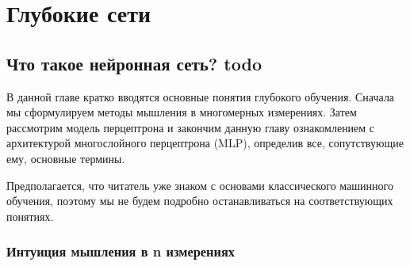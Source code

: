 






\section{Глубокие сети}

\subsection{Что такое нейронная сеть? {\color{red} todo}}

В данной главе кратко вводятся основные понятия глубокого обучения. 
Сначала мы сформулируем методы мышления в многомерных измерениях. 
Затем рассмотрим модель перцептрона и закончим данную главу ознакомлением с 
архитектурой многослойного перцептрона (MLP), 
определив все, сопутствующие ему, основные термины.

Предполагается, что читатель уже знаком с основами классического машинного обучения, 
поэтому мы не будем подробно останавливаться на соответствующих понятиях.

\subsubsection{Интуиция мышления в n измерениях}

